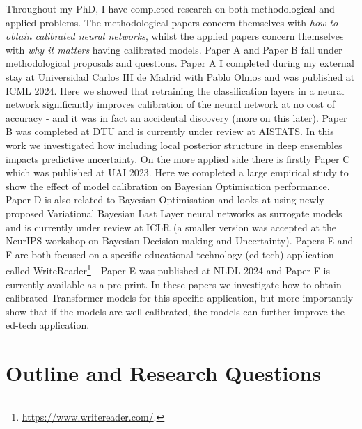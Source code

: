 \noindent Throughout my PhD, I have completed research on both methodological and applied problems. The methodological papers concern themselves with  \textit{how to obtain calibrated neural networks}, whilst the applied papers concern themselves with \textit{why it matters} having calibrated models. Paper A and Paper B fall under methodological proposals and questions. Paper A I completed during my external stay at Universidad Carlos III de Madrid with Pablo Olmos and was published at ICML 2024. Here we showed that retraining the classification layers in a neural network significantly improves calibration of the neural network at no cost of accuracy - and it was in fact an accidental discovery (more on this later). Paper B was completed at DTU and is currently under review at AISTATS. In this work we investigated how including local posterior structure in deep ensembles impacts predictive uncertainty. On the more applied side there is firstly Paper C which was published at UAI 2023. Here we completed a large empirical study to show the effect of model calibration on Bayesian Optimisation performance. Paper D is also related to Bayesian Optimisation and looks at using newly proposed Variational Bayesian Last Layer neural networks as surrogate models and is currently under review at ICLR (a smaller version was accepted at the NeurIPS workshop on Bayesian Decision-making and Uncertainty). Papers E and F are both focused on a specific educational technology (ed-tech) application called WriteReader\footnote{\url{https://www.writereader.com/}.} - Paper E was published at NLDL 2024 and Paper F is currently available as a pre-print. In these papers we investigate how to obtain calibrated Transformer models for this specific application, but more importantly show that if the models are well calibrated, the models can further improve the ed-tech application.

\section{Outline and Research Questions}

